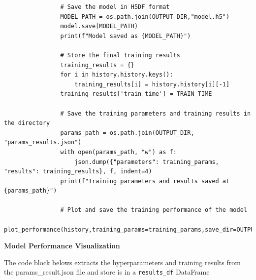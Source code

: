\documentclass[a4paper]{article}
\begin{document}
\begin{lstlisting}
                # Save the model in H5DF format
                MODEL_PATH = os.path.join(OUTPUT_DIR,"model.h5")
                model.save(MODEL_PATH)
                print(f"Model saved as {MODEL_PATH}")

                # Store the final training results
                training_results = {}
                for i in history.history.keys():
                    training_results[i] = history.history[i][-1]
                training_results['train_time'] = TRAIN_TIME
                
                # Save the training parameters and training results in the directory
                params_path = os.path.join(OUTPUT_DIR, "params_results.json")
                with open(params_path, "w") as f:
                    json.dump({"parameters": training_params, "results": training_results}, f, indent=4)
                print(f"Training parameters and results saved at {params_path}")

                # Plot and save the training performance of the model
                plot_performance(history,training_params=training_params,save_dir=OUTPUT_DIR)
\end{lstlisting}

\textbf{Model Performance Visualization}

The code block belows extracts the hyperparameters and training results from the params\_result.json file and store is in a \lstinline{results_df} DataFrame
\end{document}
